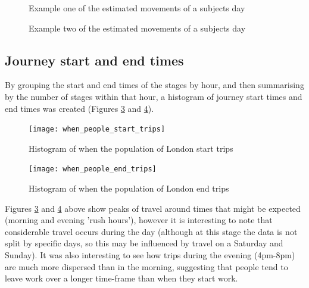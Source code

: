 \begin{landscape}

\begin{figure}[H]
\centering
{}
\caption{Example one of the estimated movements of a subjects day}
\label{fig:routed_results_example}
\end{figure}

\newpage

\begin{figure}[H]
\centering
{}
\caption{Example two of the estimated movements of a subjects day}
\label{fig:routed_results_example2}
\end{figure}

\end{landscape}

\subsection{Journey start and end times}
\label{sec:journey_start_and_end_times}

By grouping the start and end times of the stages by hour, and then summarising by the number of stages within that hour, a histogram of journey start times and end times was created (Figures \ref{fig:when_people_start_trips} and \ref{fig:when_people_end_trips}).

\begin{figure}[H]
\centering
\texttt{[image: when\_people\_start\_trips]}
\caption{Histogram of when the population of London start trips}
\label{fig:when_people_start_trips}
\end{figure}

\begin{figure}[H]
\centering
\texttt{[image: when\_people\_end\_trips]}
\caption{Histogram of when the population of London end trips}
\label{fig:when_people_end_trips}
\end{figure}

Figures \ref{fig:when_people_start_trips} and \ref{fig:when_people_end_trips} above show peaks of travel around times that might be expected (morning and evening 'rush hours'), however it is interesting to note that considerable travel occurs during the day (although at this stage the data is not split by specific days, so this may be influenced by travel on a Saturday and Sunday). It was also interesting to see how trips during the evening (4pm-8pm) are much more dispersed than in the morning, suggesting that people tend to leave work over a longer time-frame than when they start work. 

